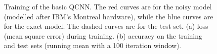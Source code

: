 \begin{figure}
\begin{subfigure}{0.49\textwidth}
        \caption{}
        \label{fig:qcnn_acc}
    \end{subfigure}
    \caption{
        Training of the basic QCNN.
        The red curves are for the noisy model (modelled after IBM's Montreal hardware), while the blue curves are for the exact model.
        The dashed curves are for the test set.
        (a) loss (mean square error) during training.
        (b) accuracy on the training and test sets (running mean with a 100 iteration window).
    }
    \label{fig:qcnn_training}
\end{figure}
